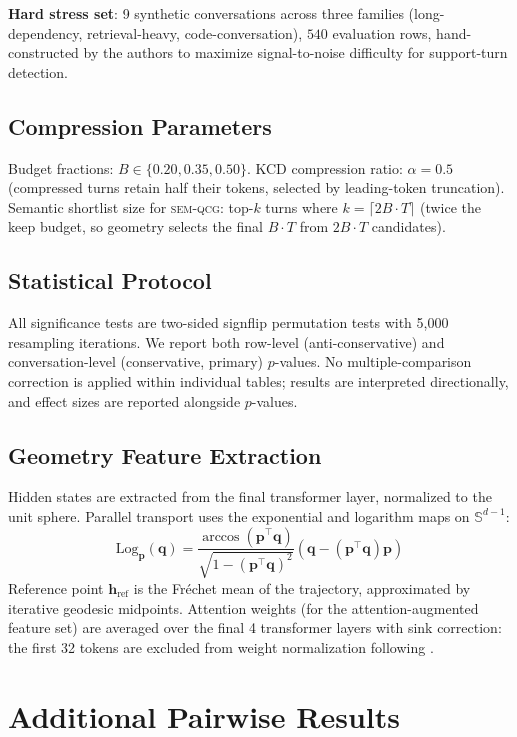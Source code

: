 \documentclass[11pt]{article}
\newcommand{\semqcg}{\textsc{sem-qcg}}
\newcommand{\hv}{\mathbf{h}}
\newcommand{\Log}{\mathrm{Log}}
\begin{document}
\textbf{Hard stress set}: 9 synthetic conversations across three families
(long-dependency, retrieval-heavy, code-conversation),
$540$ evaluation rows, hand-constructed by the authors
to maximize signal-to-noise difficulty for support-turn detection.

\subsection{Compression Parameters}
Budget fractions: $B \in \{0.20, 0.35, 0.50\}$.
KCD compression ratio: $\alpha = 0.5$ (compressed turns retain half their tokens,
selected by leading-token truncation).
Semantic shortlist size for \semqcg{}: top-$k$ turns where
$k = \lceil 2B \cdot T \rceil$ (twice the keep budget, so geometry
selects the final $B \cdot T$ from $2B \cdot T$ candidates).

\subsection{Statistical Protocol}
All significance tests are two-sided signflip permutation tests
with 5{,}000 resampling iterations.
We report both row-level (anti-conservative) and conversation-level
(conservative, primary) $p$-values.
No multiple-comparison correction is applied within individual tables;
results are interpreted directionally, and effect sizes are reported
alongside $p$-values.

\subsection{Geometry Feature Extraction}
Hidden states are extracted from the final transformer layer,
normalized to the unit sphere.
Parallel transport uses the exponential and logarithm maps on $\mathbb{S}^{d-1}$:
\[
\Log_{\mathbf{p}}(\mathbf{q}) = \frac{\arccos(\mathbf{p}^\top \mathbf{q})}{\sqrt{1 - (\mathbf{p}^\top \mathbf{q})^2}}(\mathbf{q} - (\mathbf{p}^\top \mathbf{q})\mathbf{p})
\]
Reference point $\hv_\text{ref}$ is the Fréchet mean of the trajectory,
approximated by iterative geodesic midpoints.
Attention weights (for the attention-augmented feature set) are averaged
over the final 4 transformer layers with sink correction:
the first 32 tokens are excluded from weight normalization
following \citet{xiao-etal-2023-efficient}.

\section{Additional Pairwise Results}
\label{app:pairwise}
\end{document}
